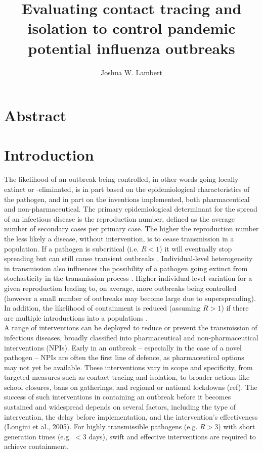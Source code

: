 \documentclass{article}
\title{Evaluating contact tracing and isolation to control pandemic potential influenza outbreaks}
\author{Joshua W. Lambert}
\date{}
\begin{document}
\maketitle

\section*{Abstract}

\section*{Introduction}

The likelihood of an outbreak being controlled, in other words going locally-extinct or -eliminated, is in part based on the epidemiological characteristics of the pathogen, and in part on the inventions implemented, both pharmaceutical and non-pharmaceutical. The primary epidemiological determinant for the spread of an infectious disease is the reproduction number, defined as the average number of secondary cases  per primary case. The higher the reproduction number the less likely a disease, without intervention, is to cease transmission in a population. If a pathogen is subcritical (i.e. $R < 1$) it will eventually stop spreading but can still cause transient outbreaks \citep{farringtonDistributionTimeExtinction1999}. Individual-level heterogeneity in transmission also influences the possibility of a pathogen going extinct from stochasticity in the transmission process \citep{lloyd-smithSuperspreadingEffectIndividual2005}. Higher individual-level variation for a given reproduction leading to, on average, more outbreaks being controlled (however a small number of outbreaks may become large due to superspreading). In addition, the likelihood of containment is reduced (assuming $R > 1$) if there are multiple introductions into a populations \citep{kucharskiEarlyDynamicsTransmission2020}. \\

A range of interventions can be deployed to reduce or prevent the transmission of infectious diseases, broadly classified into pharmaceutical and non-pharmaceutical interventions (NPIs). Early in an outbreak -- especially in the case of a novel pathogen -- NPIs are often the first line of defence, as pharmaceutical options may not yet be available. These interventions vary in scope and specificity, from targeted measures such as contact tracing and isolation, to broader actions like school closures, bans on gatherings, and regional or national lockdowns (ref). The success of such interventions in containing an outbreak before it becomes sustained and widespread depends on several factors, including the type of intervention, the delay before implementation, and the intervention’s effectiveness (Longini et al., 2005). For highly transmissible pathogens (e.g. $R>3$) with short generation times (e.g. $<3$ days), swift and effective interventions are required to achieve containment. \\
\end{document}

